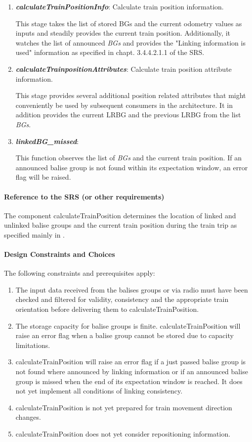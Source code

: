 \begin{enumerate}
\item \textbf{\textit{calculateTrainPositionInfo}}: Calculate train position information.

This stage takes the list of stored BGs and the current odometry values as inputs and steadily provides the current train position. Additionally, it watches the list of announced \textit{BGs} and provides the "Linking information is used" information as specified in chapt. 3.4.4.2.1.1 of the SRS. 

\item \textbf{\textit{calculateTrainpositionAttributes}}: Calculate train position attribute information.

This stage provides several additional position related attributes that might conveniently be used by subsequent consumers in the architecture. It in addition provides the current LRBG and the previous LRBG from the list \textit{BGs}. 

\item \textbf{\textit{linkedBG\_missed}}:

This function observes the list of \textit{BGs} and the current train position. If an announced balise group is not found within its expectation window, an error flag will be raised. 
\end{enumerate}


\paragraph{Reference to the SRS (or other requirements)}
The component calculateTrainPosition determines the location of linked and unlinked balise groups and the current train position during the train trip as specified mainly in \cite[Chapter~3.6]{subset-026}.

\paragraph{Design Constraints and Choices}
The following constraints and prerequisites apply:
\begin{enumerate}
\item The input data received from the balises groups or via radio must have been checked and filtered for validity, consistency and the appropriate train orientation before delivering them to calculateTrainPosition. 
\item The storage capacity for balise groups is finite. calculateTrainPosition will raise an error flag when a balise group cannot be stored due to capacity limitations.
\item calculateTrainPosition will raise an error flag if a just passed balise group is not found where announced by linking information or if an announced balise group is missed when the end of its expectation window is reached. It does not yet implement all conditions of linking consistency.
\item calculateTrainPosition is not yet prepared for train movement direction changes. 
\item calculateTrainPosition does not yet consider repositioning information.
\end{enumerate}



